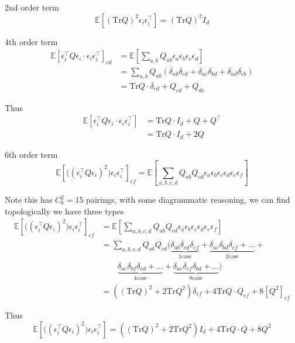    2nd order term
    \[
    \mathbb{E}[(\mathrm{Tr}Q)^{2}\epsilon_{i}\epsilon_{i}^{\top}]=(\mathrm{Tr}Q)^{2}I_{d}
    \]
    
    4th order term 
    \begin{align*}
    \mathbb{E}[\epsilon_{i}^{\top}Q\epsilon_{i}\cdot\epsilon_{i}\epsilon_{i}^{\top}]_{cd} & =\mathbb{E}[\sum_{a,b}Q_{ab}\epsilon_{a}\epsilon_{b}\epsilon_{c}\epsilon_{d}]\\
     & =\sum_{a,b}Q_{ab}(\delta_{ab}\delta_{cd}+\delta_{ac}\delta_{bd}+\delta_{ad}\delta_{cb})\\
     & =\mathrm{Tr}Q\cdot\delta_{cd}+Q_{cd}+Q_{dc}
    \end{align*}
    
    Thus
    \begin{align*}
    \mathbb{E}[\epsilon_{i}^{\top}Q\epsilon_{i}\cdot\epsilon_{i}\epsilon_{i}^{\top}] & =\mathrm{Tr}Q\cdot I_{d}+Q+Q^{\top}\\
     & =\mathrm{Tr}Q\cdot I_{d}+2Q
    \end{align*}
    
    6th order term
    \[
    \mathbb{E}[\Big((\epsilon_{i}^{\top}Q\epsilon_{i})^{2}\Big)\epsilon_{i}\epsilon_{i}^{\top}]_{ef}=\mathbb{E}[\sum_{a,b,c,d}Q_{ab}Q_{cd}\epsilon_{a}\epsilon_{b}\epsilon_{c}\epsilon_{d}\epsilon_{e}\epsilon_{f}]
    \]
    
    Note this has $C_{6}^{2}=15$ pairings, with some diagrammatic reasoning,
    we can find topologically we have three types 
    \begin{align*}
    \mathbb{E}[\Big((\epsilon_{i}^{\top}Q\epsilon_{i})^{2}\Big)\epsilon_{i}\epsilon_{i}^{\top}]_{ef} & =\mathbb{E}[\sum_{a,b,c,d}Q_{ab}Q_{cd}\epsilon_{a}\epsilon_{b}\epsilon_{c}\epsilon_{d}\epsilon_{e}\epsilon_{f}]\\
     & =\sum_{a,b,c,d}Q_{ab}Q_{cd}\Big(\underbrace{\delta_{ab}\delta_{cd}\delta_{ef}}_{1\text{case}}+\underbrace{\delta_{ac}\delta_{bd}\delta_{ef}+...}_{2\text{case}}+\\
     & \quad\quad\underbrace{\delta_{ae}\delta_{bf}\delta_{cd}+...}_{4\text{case}}+\underbrace{\delta_{ae}\delta_{cf}\delta_{bd}+...}_{8\text{case}}\Big)\\
     & =((\mathrm{Tr}Q)^{2}+2\mathrm{Tr}Q^{2})\delta_{ef}+4\mathrm{Tr}Q\cdot Q_{ef}+8[Q^{2}]_{ef}
    \end{align*}
    
    Thus 
    \[
    \mathbb{E}[\Big((\epsilon_{i}^{\top}Q\epsilon_{i})^{2}\Big)\epsilon_{i}\epsilon_{i}^{\top}]=((\mathrm{Tr}Q)^{2}+2\mathrm{Tr}Q^{2})I_{d}+4\mathrm{Tr}Q\cdot Q+8Q^{2}
    \]
    
